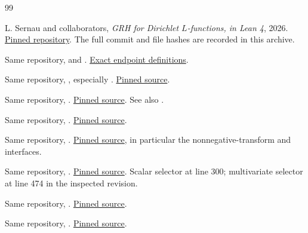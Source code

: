 \begin{thebibliography}{99}
\raggedright
{}
L. Sernau and collaborators,
\emph{GRH for Dirichlet \(L\)-functions, in Lean 4}, 2026.
\href{https://github.com/lsernau/grh-lean/tree/72fead102f663d5c7a407964a13dc0cf9d977207}{Pinned repository}.
The full commit and file hashes are recorded in this archive.

Same repository,  and
.
\href{https://github.com/lsernau/grh-lean/blob/72fead102f663d5c7a407964a13dc0cf9d977207/grh/src/Statements.lean}{Exact endpoint definitions}.

Same repository, ,
especially .
\href{https://github.com/lsernau/grh-lean/blob/72fead102f663d5c7a407964a13dc0cf9d977207/grh/src/New/Reduction/MainInequality.lean}{Pinned source}.

Same repository, .
\href{https://github.com/lsernau/grh-lean/blob/72fead102f663d5c7a407964a13dc0cf9d977207/grh/src/New/Reduction/OneSidedBound.lean}{Pinned source}.
See also .

Same repository, .
\href{https://github.com/lsernau/grh-lean/blob/72fead102f663d5c7a407964a13dc0cf9d977207/grh/src/New/Reduction/Zeros/Criterion.lean}{Pinned source}.

Same repository, .
\href{https://github.com/lsernau/grh-lean/blob/72fead102f663d5c7a407964a13dc0cf9d977207/grh/src/Lib/Analytic/Landau.lean}{Pinned source}, in particular the nonnegative-transform and  interfaces.

Same repository, .
\href{https://github.com/lsernau/grh-lean/blob/72fead102f663d5c7a407964a13dc0cf9d977207/grh/src/New/Congruences/Selmer/RootsOfUnity.lean}{Pinned source}.
Scalar selector at line 300; multivariate selector at line 474 in
the inspected revision.

Same repository, .
\href{https://github.com/lsernau/grh-lean/blob/72fead102f663d5c7a407964a13dc0cf9d977207/grh/src/Lib/Cyclotomic/OddSha.lean}{Pinned source}.

Same repository, .
\href{https://github.com/lsernau/grh-lean/blob/72fead102f663d5c7a407964a13dc0cf9d977207/grh/src/New/Congruences/FirstOrder/DenominatorBound.lean}{Pinned source}.


\end{thebibliography}
